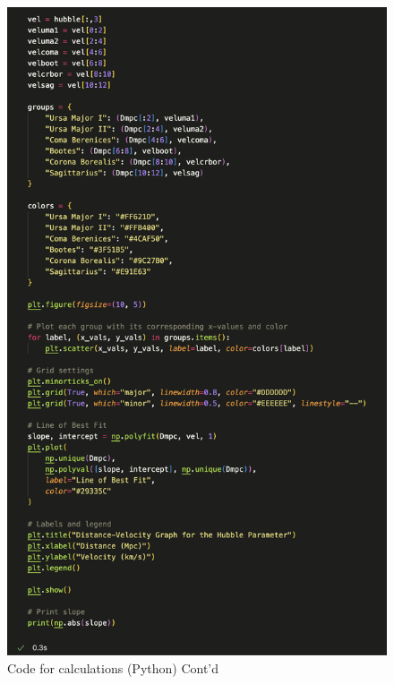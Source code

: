 \documentclass[12pt]{article}
\begin{document}
\newpage

\begin{figure}[H]
    \centering
    \includegraphics[width=14cm]{HUBBLEcode2.png}
    \caption{\centering Code for calculations (Python) Cont'd}
    \label{fig:code2}  
\end{figure}

\newpage
\end{document}
